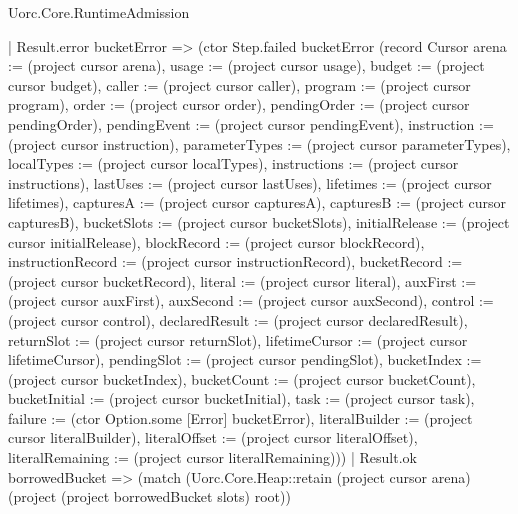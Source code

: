 \begin{lexlean}{Uorc.Core.RuntimeAdmission}
\begin{semanticmodule}
{              | Result.error bucketError => (ctor Step.failed bucketError (record Cursor {arena := (project cursor arena), usage := (project cursor usage), budget := (project cursor budget), caller := (project cursor caller), program := (project cursor program), order := (project cursor order), pendingOrder := (project cursor pendingOrder), pendingEvent := (project cursor pendingEvent), instruction := (project cursor instruction), parameterTypes := (project cursor parameterTypes), localTypes := (project cursor localTypes), instructions := (project cursor instructions), lastUses := (project cursor lastUses), lifetimes := (project cursor lifetimes), capturesA := (project cursor capturesA), capturesB := (project cursor capturesB), bucketSlots := (project cursor bucketSlots), initialRelease := (project cursor initialRelease), blockRecord := (project cursor blockRecord), instructionRecord := (project cursor instructionRecord), bucketRecord := (project cursor bucketRecord), literal := (project cursor literal), auxFirst := (project cursor auxFirst), auxSecond := (project cursor auxSecond), control := (project cursor control), declaredResult := (project cursor declaredResult), returnSlot := (project cursor returnSlot), lifetimeCursor := (project cursor lifetimeCursor), pendingSlot := (project cursor pendingSlot), bucketIndex := (project cursor bucketIndex), bucketCount := (project cursor bucketCount), bucketInitial := (project cursor bucketInitial), task := (project cursor task), failure := (ctor Option.some [Error] bucketError), literalBuilder := (project cursor literalBuilder), literalOffset := (project cursor literalOffset), literalRemaining := (project cursor literalRemaining)}))
              | Result.ok borrowedBucket => (match (Uorc.Core.Heap::retain (project cursor arena) (project (project borrowedBucket slots) root))
}
\end{semanticmodule}
\end{lexlean}
